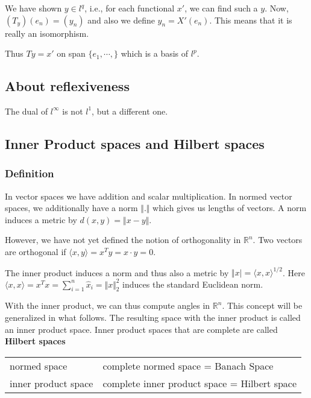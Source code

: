 \documentclass[11pt]{article}
\def\R{\mathbb{R}}
\begin{document}
We have shown \(y\in l^q\), i.e., for each functional \(x'\), we can find such a
\(y\). Now, \((T_y)(e_n) = (y_n)\) and also we define \(y_n = X'(e_n)\). This
means that it is really an isomorphism.

Thus \(Ty = x'\) on span \(\{e_1, \cdots,\}\) which is a basis of \(l^p\).
\subsection{About reflexiveness}
\label{sec:org527b8d9}
The dual of \(l^\infty\) is not \(l^1\), but a different one.
\subsection{Inner Product spaces and Hilbert spaces}
\label{sec:org8975544}
\subsubsection{Definition}
\label{sec:org97dd677}
In vector spaces we have addition and scalar multiplication. In normed
vector spaces, we additionally have a norm \(\Vert . \Vert\) which gives us
lengths of vectors. A norm induces a metric by \(d(x, y) = \Vert x - y
    \Vert\).

However, we have not yet defined the notion of orthogonality in \(\R^n\). Two
vectors are orthogonal if \(\langle x, y \rangle = x^{T} y = x \cdot y = 0\).

The inner product induces a norm and thus also a metric by \(\Vert x \vert =
    \langle x, x \rangle^{1/2}\). Here \(\langle x, x \rangle = x^{T} x =
    \sum_{i=1}^{n} \hat{x}_i = \Vert x \Vert_2^2\) induces the standard Euclidean
norm.

With the inner product, we can thus compute angles in \(\R^n\). This concept
will be generalized in what follows. The resulting space with the inner
product is called an inner product space. Inner product spaces that are
complete are called \textbf{Hilbert spaces}

\begin{center}
\begin{tabular}{ll}
normed space & complete normed space = Banach Space\\
inner product space & complete inner product space = Hilbert space\\
\end{tabular}
\end{center}
\end{document}
